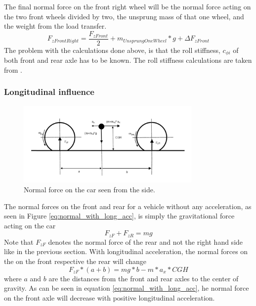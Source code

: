 The final normal force on the front right wheel will be the normal force acting on the two front wheels divided by two, the unsprung mass of that one wheel, and the weight from the load transfer.
\begin{equation}
	F_{zFrontRight} = \frac{F_{zFront}}{2} + m_{UnsprungOneWheel}*g + \Delta F_{zFront}
\end{equation}
The problem with the calculations done above, is that the roll stiffness, $ c_{\phi i} $ of both front and rear axle has to be known. The roll stiffness calculations are taken from \cite{pacejka}.



\subsubsection{Longitudinal influence}

\begin{figure}[h]
	\centering
	\includegraphics[width=0.8\textwidth]{Pictures/normal_force_longitudinal}
	\caption{Normal force on the car seen from the side.}
	\label{normal_force_longitudinal}
\end{figure}
The normal forces on the front and rear for a vehicle without any acceleration, as seen in Figure \ref{eq:normal_with_long_acc}, is simply the gravitational force acting on the car
\begin{equation} \label{eq:normal_2}
	F_{zF} + F_{zR} = mg
\end{equation}
Note that $ F_{zF} $ denotes the normal force of the rear and not the right hand side like in the previous section. With longitudinal acceleration, the normal forces on the on the front respective the rear will change
\begin{equation} \label{eq:normal_with_long_acc}
	F_{zF}*(a+b) = mg*b - m*a_{x}*CGH
\end{equation}
where $ a $ and $ b $ are the distances from the front and rear axles to the center of gravity. As can be seen in equation \ref{eq:normal_with_long_acc}, he normal force on the front axle will decrease with positive longitudinal acceleration. 

